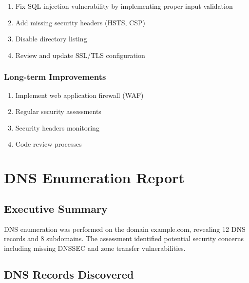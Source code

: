 \documentclass[12pt,a4paper]{report}
\begin{document}
\begin{enumerate}
    \item Fix SQL injection vulnerability by implementing proper input validation
    \item Add missing security headers (HSTS, CSP)
    \item Disable directory listing
    \item Review and update SSL/TLS configuration
\end{enumerate}

\subsubsection{Long-term Improvements}

\begin{enumerate}
    \item Implement web application firewall (WAF)
    \item Regular security assessments
    \item Security headers monitoring
    \item Code review processes
\end{enumerate}

\section{DNS Enumeration Report}

\subsection{Executive Summary}

DNS enumeration was performed on the domain example.com, revealing 12 DNS records and 8 subdomains. The assessment identified potential security concerns including missing DNSSEC and zone transfer vulnerabilities.

\subsection{DNS Records Discovered}
\end{document}

